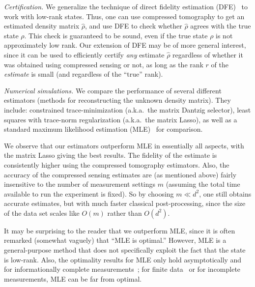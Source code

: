 \textit{Certification.}  We generalize the technique of direct fidelity estimation (DFE)~\cite{Flammia2011, daSilva2011} to work with low-rank states.
Thus, one can use compressed tomography to get an estimated density matrix $\hat{\rho}$, and use DFE to check whether $\hat{\rho}$ agrees with the true state $\rho$. This check is guaranteed to be sound, even if the true state $\rho$ is not approximately low rank. Our extension of DFE may be of more general interest, since it can be used to efficiently certify \textit{any} estimate $\hat\rho$ regardless of whether it was obtained using compressed sensing or not, as long as the rank $r$ of the \textit{estimate} is small (and regardless of the ``true'' rank). 



\textit{Numerical simulations.} We compare the performance of several different estimators (methods for reconstructing the unknown density matrix). They include: constrained trace-minimization (a.k.a.\ the matrix Dantzig selector), least squares with trace-norm regularization (a.k.a.\ the matrix Lasso), as well as a standard maximum likelihood estimation (MLE)~\cite{Hradil1997, Banaszek1999, James2001} for comparison. 

We observe that our estimators outperform MLE in essentially all aspects, with the matrix Lasso giving the best results. The fidelity of the estimate is consistently higher using the compressed tomography estimators. Also, the accuracy of the compressed sensing estimates are (as mentioned above) fairly insensitive to the number of measurement settings $m$ (assuming the total time available to run the experiment is fixed). So by choosing $m \ll d^2$, one still obtains accurate estimates, but with much faster classical post-processing, since the size of the data set scales like $O(m)$ rather than $O(d^2)$. 

It may be surprising to the reader that we outperform MLE, since it is often remarked (somewhat vaguely) that ``MLE is optimal.'' However, MLE is a general-purpose method that does not specifically exploit the fact that the state is low-rank. Also, the optimality results for MLE only hold asymptotically and for informationally complete measurements~\cite{Sugiyama2011, Shen2001}; for finite data~\cite{Chakrabarti2009} or for incomplete measurements, MLE can be far from optimal.

